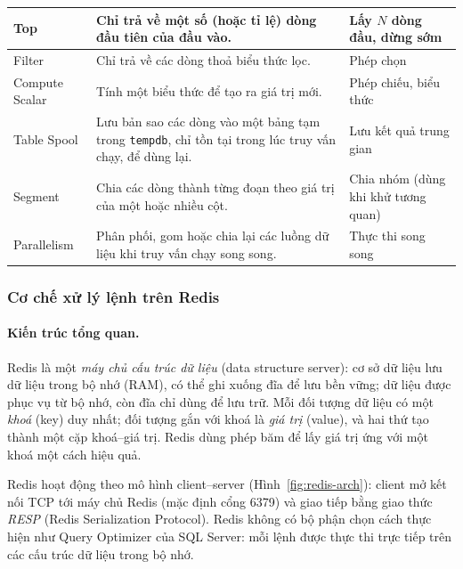 \begin{longtable}{>{\raggedright\arraybackslash}p{3.3cm} >{\raggedright\arraybackslash}p{8.6cm} >{\raggedright\arraybackslash}p{3.6cm}}
    Top & Chỉ trả về một số (hoặc tỉ lệ) dòng đầu tiên của đầu vào. & Lấy $N$ dòng đầu, dừng sớm \\
    \midrule
    Filter & Chỉ trả về các dòng thoả biểu thức lọc. & Phép chọn \\
    Compute Scalar & Tính một biểu thức để tạo ra giá trị mới. & Phép chiếu, biểu thức \\
    Table Spool & Lưu bản sao các dòng vào một bảng tạm trong \texttt{tempdb}, chỉ tồn tại trong lúc truy vấn chạy, để dùng lại. & Lưu kết quả trung gian \\
    Segment & Chia các dòng thành từng đoạn theo giá trị của một hoặc nhiều cột. & Chia nhóm (dùng khi khử tương quan) \\
    Parallelism & Phân phối, gom hoặc chia lại các luồng dữ liệu khi truy vấn chạy song song. & Thực thi song song \\
    \bottomrule
\end{longtable}

\subsubsection{Cơ chế xử lý lệnh trên Redis}

\paragraph{Kiến trúc tổng quan.}
Redis là một \textit{máy chủ cấu trúc dữ liệu} (data structure server): cơ sở dữ liệu lưu dữ liệu trong bộ nhớ (RAM), có thể ghi xuống đĩa để lưu bền vững; dữ liệu được phục vụ từ bộ nhớ, còn đĩa chỉ dùng để lưu trữ. Mỗi đối tượng dữ liệu có một \textit{khoá} (key) duy nhất; đối tượng gắn với khoá là \textit{giá trị} (value), và hai thứ tạo thành một cặp khoá--giá trị. Redis dùng phép băm để lấy giá trị ứng với một khoá một cách hiệu quả.

Redis hoạt động theo mô hình client--server (Hình~\ref{fig:redis-arch}): client mở kết nối TCP tới máy chủ Redis (mặc định cổng 6379) và giao tiếp bằng giao thức \textit{RESP} (Redis Serialization Protocol). Redis không có bộ phận chọn cách thực hiện như Query Optimizer của SQL Server: mỗi lệnh được thực thi trực tiếp trên các cấu trúc dữ liệu trong bộ nhớ.

